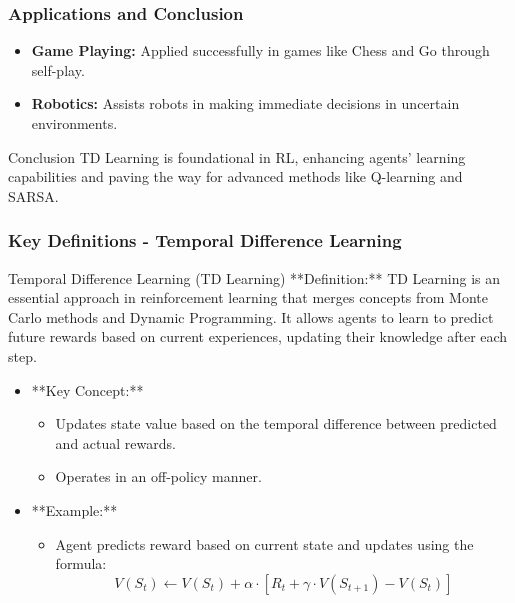 \documentclass[aspectratio=169]{beamer}
\begin{document}
\begin{frame}[fragile]
    \frametitle{Applications and Conclusion}
    \begin{itemize}
        \item \textbf{Game Playing:} Applied successfully in games like Chess and Go through self-play.
        \item \textbf{Robotics:} Assists robots in making immediate decisions in uncertain environments.
    \end{itemize}
    \begin{block}{Conclusion}
        TD Learning is foundational in RL, enhancing agents’ learning capabilities and paving the way for advanced methods like Q-learning and SARSA.
    \end{block}
\end{frame}

\begin{frame}[fragile]
    \frametitle{Key Definitions - Temporal Difference Learning}
    \begin{block}{Temporal Difference Learning (TD Learning)}
        **Definition:** TD Learning is an essential approach in reinforcement learning that merges concepts from Monte Carlo methods and Dynamic Programming. It allows agents to learn to predict future rewards based on current experiences, updating their knowledge after each step.
    \end{block}

    \begin{itemize}
        \item **Key Concept:**
            \begin{itemize}
                \item Updates state value based on the temporal difference between predicted and actual rewards.
                \item Operates in an off-policy manner.
            \end{itemize}

        \item **Example:**
            \begin{itemize}
                \item Agent predicts reward based on current state and updates using the formula:
                \[
                V(S_t) \leftarrow V(S_t) + \alpha \cdot [R_t + \gamma \cdot V(S_{t+1}) - V(S_t)]
                \]
            \end{itemize}
    \end{itemize}
\end{frame}
\end{document}
